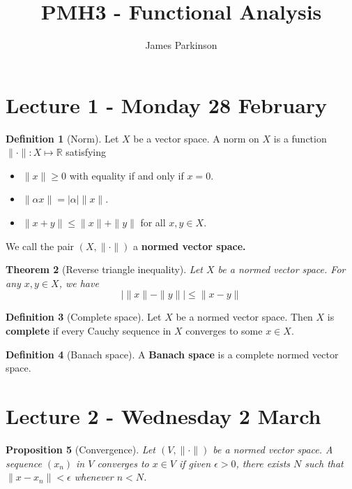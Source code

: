 \documentclass[10pt, oneside, reqno]{amsart}
\title{PMH3 - Functional Analysis}								%
\author{James Parkinson}
\theoremstyle{plain}%
\newtheorem{thm}{Theorem}[section]
\newtheorem{prop}[thm]{Proposition}
\theoremstyle{definition}
\newtheorem{defn}[thm]{Definition}
\theoremstyle{remark}
\newcommand{\R}{\mathbb{R}}
\begin{document}
\maketitle

\section{Lecture 1 - Monday 28 February} %
\label{sec:lecture_1_28_february}

\begin{defn}[Norm]
	Let $X$ be a vector space.  A norm on $X$ is a function $\| \cdot \| : X \mapsto \R$ satisfying 
	\begin{itemize}
		\item $\| x \| \geq 0$ with equality if and only if $x = 0$.  
		\item $\| \alpha x \| = | \alpha | \| x \|$.
		\item $\| x + y \| \leq \| x \| + \| y \|$ for all $x, y \in X$.  
	\end{itemize}
	
	We call the pair $(X, \| \cdot \|)$ a \textbf{normed vector space.}
\end{defn}

\begin{thm}[Reverse triangle inequality]
	Let $X$ be a normed vector space.  For any $x, y \in X$, we have \[
		\left| \|x \| - \| y \| \right| \leq \| x - y \|  
	\]
\end{thm}

\begin{defn}[Complete space]
	Let $X$ be a normed vector space.  Then $X$ is \textbf{complete} if every Cauchy sequence in $X$ converges to some $x \in X$.  
\end{defn}

\begin{defn}[Banach space]
	A \textbf{Banach space} is a complete normed vector space.
\end{defn}



\section{Lecture 2 - Wednesday 2 March} %
\label{sec:lecture_2_2_march}

\begin{prop}[Convergence] Let $(V, \| \cdot \| )$ be a normed vector space.  A sequence $(x_n)$ in $V$ converges to $x \in V$ if given $\epsilon > 0$, there exists $N$ such that $\| x - x_n \| < \epsilon$ whenever $n < N$. 
\end{prop}
\end{document}

